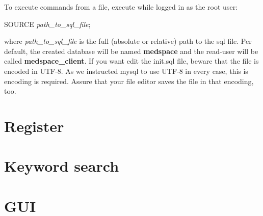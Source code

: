 To execute commands from a file, execute while logged in as the root user:

\begin{codebox}
	SOURCE \emph{path\_to\_sql\_file};
\end{codebox}

where \emph{path\_to\_sql\_file} is the full (absolute or relative) path to the sql file.
Per default, the created database will be named \textbf{medspace} and the read-user will be called \textbf{medspace\_client}. If you want edit the init.sql file, beware that the file is encoded in UTF-8. As we instructed mysql to use UTF-8 in every case, this is encoding is required. Assure that your file editor saves the file in that encoding, too.




\section{Register}

\section{Keyword search}
\section{GUI}
